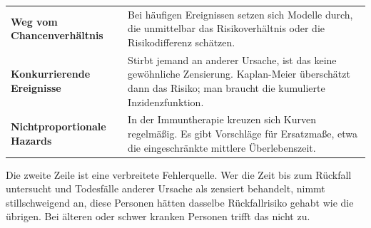 \begin{forschung}
\begin{center}
{\small
\renewcommand{\arraystretch}{1.45}
\begin{tabular}{@{}P{3.0cm}P{5.2cm}@{}}
\toprule
\textbf{Weg vom Chancen\-verhältnis} & Bei häufigen Ereignissen setzen sich Modelle durch, die unmittelbar das Risikoverhältnis oder die Risikodifferenz schätzen.\\
\textbf{Konkurrierende Ereignisse} & Stirbt jemand an anderer Ursache, ist das keine gewöhnliche Zensierung. Kaplan-Meier überschätzt dann das Risiko; man braucht die kumulierte Inzidenzfunktion.\\
\textbf{Nichtpro\-portionale Hazards} & In der Immuntherapie kreuzen sich Kurven regelmäßig. Es gibt Vorschläge für Ersatzmaße, etwa die eingeschränkte mittlere Überlebenszeit.\\
\bottomrule
\end{tabular}}
\end{center}

Die zweite Zeile ist eine verbreitete Fehlerquelle. Wer die Zeit bis zum Rückfall untersucht und Todesfälle anderer Ursache als zensiert behandelt, nimmt stillschweigend an, diese Personen hätten dasselbe Rückfallrisiko gehabt wie die übrigen. Bei älteren oder schwer kranken Personen trifft das nicht zu.

\begin{center}
\begin{minipage}{0.88\textwidth}
\end{minipage}
\end{center}
\end{forschung}

